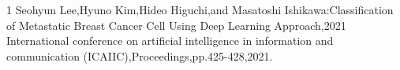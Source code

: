 \begin{査読付}{1}
Seohyun Lee,Hyuno Kim,Hideo Higuchi,and Masatoshi Ishikawa:Classification of Metastatic Breast Cancer Cell Using Deep Learning Approach,2021 International conference on artificial intelligence in information and communication (ICAIIC),Proceedings,pp.425-428,2021.

\end{査読付}

